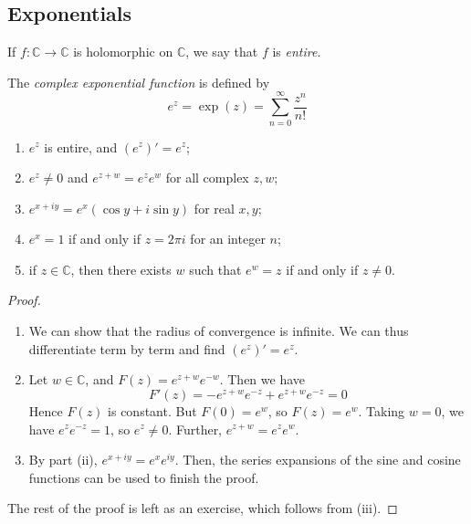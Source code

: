 \subsection{Exponentials}
\begin{definition}
	If \( f \colon \mathbb C \to \mathbb C \) is holomorphic on \( \mathbb C \), we say that \( f \) is \textit{entire}.
\end{definition}
\begin{definition}
	The \textit{complex exponential function} is defined by
	\[
		e^z = \exp(z) = \sum_{n=0}^\infty \frac{z^n}{n!}
	\]
\end{definition}
\begin{proposition}
	\begin{enumerate}
		\item \( e^z \) is entire, and \( (e^z)' = e^z \);
		\item \( e^z \neq 0 \) and \( e^{z+w} = e^z e^w \) for all complex \( z, w \);
		\item \( e^{x+iy} = e^x(\cos y + i \sin y) \) for real \( x, y \);
		\item \( e^x = 1 \) if and only if \( z = 2 \pi i \) for an integer \( n \);
		\item if \( z \in \mathbb C \), then there exists \( w \) such that \( e^w = z \) if and only if \( z \neq 0 \).
	\end{enumerate}
\end{proposition}
\begin{proof}
	\begin{enumerate}
		\item We can show that the radius of convergence is infinite.
		      We can thus differentiate term by term and find \( (e^z)' = e^z \).
		\item Let \( w \in \mathbb C \), and \( F(z) = e^{z+w} e^{-w} \).
		      Then we have
		      \[
			      F'(z) = -e^{z+w} e^{-z} + e^{z+w} e^{-z} = 0
		      \]
		      Hence \( F(z) \) is constant.
		      But \( F(0) = e^w \), so \( F(z) = e^w \).
		      Taking \( w = 0 \), we have \( e^z e^{-z} = 1 \), so \( e^z \neq 0 \).
		      Further, \( e^{z+w} = e^z e^w \).
		\item By part (ii), \( e^{x+iy} = e^x e^{iy} \).
		      Then, the series expansions of the sine and cosine functions can be used to finish the proof.
	\end{enumerate}
	The rest of the proof is left as an exercise, which follows from (iii).
\end{proof}

